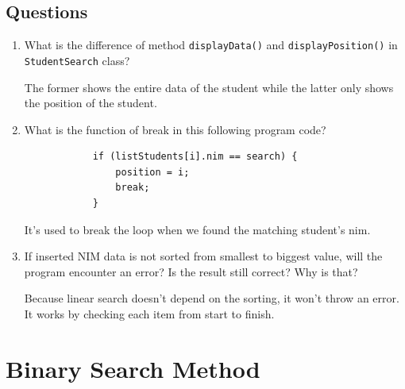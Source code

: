 \documentclass[12pt,titlepage]{article}
\begin{document}
\subsection{Questions}
\begin{enumerate}
    \item {
        What is the difference of method \texttt{displayData()} and \texttt{displayPosition()} in \texttt{StudentSearch} class?

        The former shows the entire data of the student while the latter only shows the position of the student.
    }
    \item {
        What is the function of break in this following program code?

        \begin{verbatim}
            if (listStudents[i].nim == search) {
                position = i;
                break;
            }
        \end{verbatim}

        It's used to break the loop when we found the matching student's nim.
    }
    \item {
        If inserted NIM data is not sorted from smallest to biggest value, will the program encounter an error? 
        Is the result still correct? Why is that?

        Because linear search doesn't depend on the sorting, it won't throw an error. It works by checking each item from start to finish.
    }
\end{enumerate}

\section{Binary Search Method}
\end{document}

